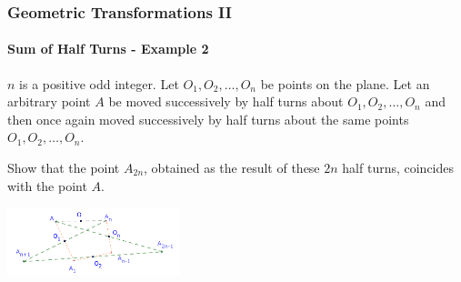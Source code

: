 \documentclass[8pt,xcolor=table,dvipsnames]{beamer}
\begin{document}
\begin{frame}[t]
    \frametitle{Geometric Transformations II}
    \framesubtitle{Sum of Half Turns - Example 2}
    \begin{example}
        $n$ is a positive odd integer. Let $O_1, O_2, \ldots, O_{n}$ be points on the plane.
        Let an arbitrary point $A$ be moved successively by half turns about $O_1, O_2, \ldots, O_{n}$
        and then once again moved successively by half turns about the same points $O_1, O_2, \ldots, O_{n}$.
        
        \bigbreak
        Show that the point $A_{2n}$, obtained as the result of these $2n$ half turns, coincides with the point $A.$
    \end{example}

    \begin{center}
        \includegraphics[width=5cm]{./svg/pdf/translation-2a.pdf}
    \end{center}
\end{frame}
\end{document}
